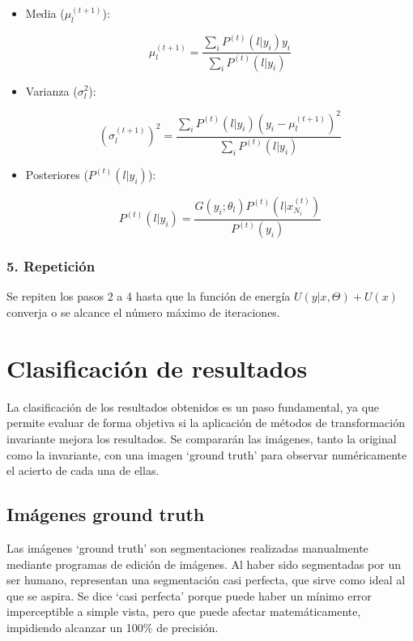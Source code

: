 \begin{itemize}
\setlength{\itemsep}{-1ex}
   \item{\begin{flushleft} Media ($\mu_l^{(t+1)}$): \end{flushleft}}

    $$\mu_l^{(t+1)} =\frac{\sum_i P^{(t)} (l|y_i )y_i }{\sum_i P^{(t)} (l|y_i )}$$

   \item{\begin{flushleft} Varianza ($\sigma_l^2$): \end{flushleft}}

    $$(\sigma_l^{(t+1)} )^2 =\frac{\sum_i P^{(t)} (l|y_i )(y_i -\mu_l^{(t+1)} )^2 }{\sum_i P^{(t)} (l|y_i )}$$

   \item{\begin{flushleft} Posteriores ($P^{(t)} (l|y_i )$): \end{flushleft}}

    $$P^{(t)} (l|y_i )=\frac{G(y_i ;\theta_l )P^{(t)} (l|x_{N_i }^{(t)} )}{P^{(t)} (y_i )}$$
\end{itemize}

\subsubsection{5. Repetición}

Se repiten los pasos 2 a 4 hasta que la función de energía $U(y|x,\Theta )+U(x)$ converja o se alcance el número máximo de iteraciones.

\section{Clasificación de resultados}\label{clasificacion-de-resultados}

La clasificación de los resultados obtenidos es un paso fundamental, ya que permite evaluar de forma objetiva si la aplicación de métodos de transformación invariante mejora los resultados. Se compararán las imágenes, tanto la original como la invariante, con una imagen `ground truth' para observar numéricamente el acierto de cada una de ellas.

\subsection{Imágenes ground truth}\label{imagenes-ground-truth}

Las imágenes `ground truth' son segmentaciones realizadas manualmente mediante programas de edición de imágenes. Al haber sido segmentadas por un ser humano, representan una segmentación casi perfecta, que sirve como ideal al que se aspira. Se dice `casi perfecta' porque puede haber un mínimo error imperceptible a simple vista, pero que puede afectar matemáticamente, impidiendo alcanzar un 100\% de precisión.

